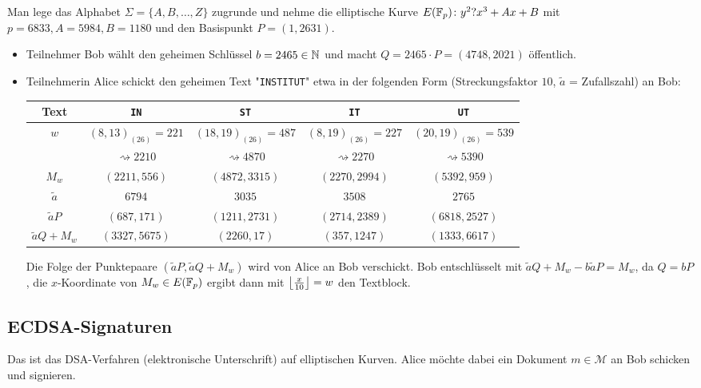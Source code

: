 \begin{bsp}
	Man lege das Alphabet $\Sigma = \{A,B,\dots,Z\}$ zugrunde und nehme die elliptische Kurve $E(\mathbb{F}_p)\colon y^2 ? x^3 + Ax + B$ mit $p = 6833, A = 5984, B=1180$ und den Basispunkt $P = (1,2631)$.
	\begin{itemize}
		\item Teilnehmer Bob wählt den geheimen Schlüssel $b = 2465 \in \mathbb{N}$ und macht $Q = 2465\cdot P = (4748,2021)$ öffentlich.
		\item Teilnehmerin Alice schickt den geheimen Text "\texttt{INSTITUT}" etwa in der folgenden Form (Streckungsfaktor $10$, $\tilde{a}$ = Zufallszahl) an Bob:
		\begin{center}
				\begin{tabular}{c|c|c|c|c}
				Text & \texttt{IN} & \texttt{ST} & \texttt{IT} & \texttt{UT} \\ 
				\hline $w$ & $(8,13)_{(26)} = 221$ & $(18,19)_{(26)} = 487 $ & $(8,19)_{(26)} = 227 $ & $(20,19)_{(26)} = 539 $ \\ 
				& $\rightsquigarrow 2210$ & $\rightsquigarrow 4870$ & $\rightsquigarrow 2270$ & $\rightsquigarrow 5390$ \\
				$M_w$ & $(2211,556)$ & $(4872,3315)$ & $(2270,2994)$ & $(5392,959)$ \\ 
				$\tilde{a}$ & $6794$ & $3035$ & $3508$ & $2765$ \\ 
				$\tilde{a}P$ & $(687,171)$ & $(1211,2731)$ & $(2714,2389)$ & $(6818,2527)$ \\ 
				$\tilde{a}Q + M_w$ & $(3327,5675)$ & $(2260,17)$ & $(357,1247)$ & $(1333,6617)$
				\end{tabular} 
		\end{center}
		Die Folge der Punktepaare $(\tilde{a}P,\tilde{a}Q + M_w)$ wird von Alice an Bob verschickt.
		Bob entschlüsselt mit $\tilde{a}Q + M_w - b \tilde{a}P = M_w$, da $Q = bP$, die $x$-Koordinate von $M_w \in E(\mathbb{F}_p)$ ergibt dann mit $\left\lfloor\frac{x}{10}\right\rfloor = w$ den Textblock.
	\end{itemize}
\end{bsp}

\subsection{ECDSA-Signaturen}
\label{sub:4.3}
\begin{bem}
	Das  ist das DSA-Verfahren (elektronische Unterschrift) auf elliptischen Kurven.
	Alice möchte dabei ein Dokument $m \in \mathcal{M}$ an Bob schicken und signieren.
\end{bem}

